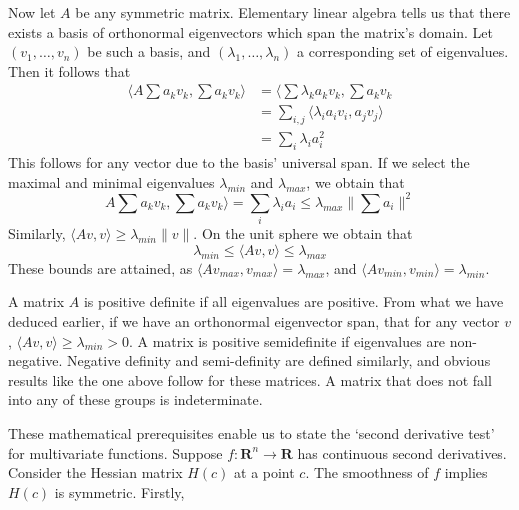 Now let $A$ be any symmetric matrix. Elementary linear algebra tells us that there exists a basis of orthonormal eigenvectors which span the matrix's domain. Let $(v_1, \dots, v_n)$ be such a basis, and $(\lambda_1, \dots, \lambda_n)$ a corresponding set of eigenvalues. Then it follows that
%
\begin{align*}
    \langle A \sum a_k v_k, \sum a_k v_k \rangle &= \langle \sum \lambda_k a_k v_k, \sum a_k v_k\\
    &= \sum_{i,j} \langle \lambda_i a_i v_i, a_j v_j \rangle\\
    &= \sum_i \lambda_i a_i^2
\end{align*}
%
This follows for any vector due to the basis' universal span. If we select the maximal and minimal eigenvalues $\lambda_{min}$ and $\lambda_{max}$, we obtain that
%
\[ A \sum a_k v_k, \sum a_k v_k \rangle = \sum_i \lambda_i a_i \leq \lambda_{max} \| \sum a_i \|^2 \]
%
Similarly, $\langle Av, v \rangle \geq \lambda_{min} \|v\|$. On the unit sphere we obtain that
%
\[ \lambda_{min} \leq \langle Av, v \rangle \leq \lambda_{max} \]
%
These bounds are attained, as $\langle Av_{max}, v_{max} \rangle = \lambda_{max}$, and $\langle Av_{min}, v_{min} \rangle = \lambda_{min}$.

A matrix $A$ is positive definite if all eigenvalues are positive. From what we have deduced earlier, if we have an orthonormal eigenvector span, that for any vector $v$, $\langle Av, v \rangle \geq \lambda_{min} > 0$. A matrix is positive semidefinite if eigenvalues are non-negative. Negative definity and semi-definity are defined similarly, and obvious results like the one above follow for these matrices. A matrix that does not fall into any of these groups is indeterminate.

These mathematical prerequisites enable us to state the `second derivative test' for multivariate functions. Suppose $f:\mathbf{R}^n \to \mathbf{R}$ has continuous second derivatives. Consider the Hessian matrix $H(c)$ at a point $c$. The smoothness of $f$ implies $H(c)$ is symmetric. Firstly,

